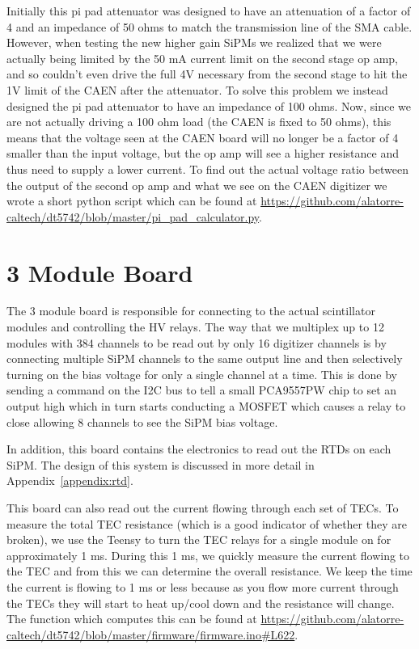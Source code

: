 \documentclass[12pt,openright,twoside]{report}
\begin{document}
Initially this pi pad attenuator was designed to have an attenuation of a
factor of 4 and an impedance of 50 ohms to match the transmission line of the
SMA cable. However, when testing the new higher gain SiPMs we realized that we
were actually being limited by the 50 mA current limit on the second stage op
amp, and so couldn't even drive the full 4V necessary from the second stage to
hit the 1V limit of the CAEN after the attenuator. To solve this problem we
instead designed the pi pad attenuator to have an impedance of 100 ohms. Now,
since we are not actually driving a 100 ohm load (the CAEN is fixed to 50
ohms), this means that the voltage seen at the CAEN board will no longer be a
factor of 4 smaller than the input voltage, but the op amp will see a higher
resistance and thus need to supply a lower current. To find out the actual
voltage ratio between the output of the second op amp and what we see on the
CAEN digitizer we wrote a short python script which can be found at
\url{https://github.com/alatorre-caltech/dt5742/blob/master/pi_pad_calculator.py}.

\section{3 Module Board}
The 3 module board is responsible for connecting to the actual scintillator
modules and controlling the HV relays. The way that we multiplex up to 12
modules with 384 channels to be read out by only 16 digitizer channels is by
connecting multiple SiPM channels to the same output line and then selectively
turning on the bias voltage for only a single channel at a time. This is done
by sending a command on the I2C bus to tell a small PCA9557PW chip to set an
output high which in turn starts conducting a MOSFET which causes a relay to
close allowing 8 channels to see the SiPM bias voltage.

In addition, this board contains the electronics to read out the RTDs on each
SiPM. The design of this system is discussed in more detail in
Appendix~\ref{appendix:rtd}.

This board can also read out the current flowing through each set of TECs. To
measure the total TEC resistance (which is a good indicator of whether they are
broken), we use the Teensy to turn the TEC relays for a single module on for
approximately 1 ms. During this 1 ms, we quickly measure the current flowing to
the TEC and from this we can determine the overall resistance. We keep the time
the current is flowing to 1 ms or less because as you flow more current through
the TECs they will start to heat up/cool down and the resistance will change.
The function which computes this can be found at
\url{https://github.com/alatorre-caltech/dt5742/blob/master/firmware/firmware.ino#L622}.
\end{document}
